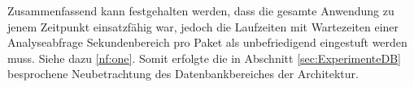     \noindent Zusammenfassend kann festgehalten werden, dass die gesamte Anwendung zu jenem Zeitpunkt einsatzfähig war, jedoch die Laufzeiten mit Wartezeiten einer Analyseabfrage Sekundenbereich pro Paket als unbefriedigend eingestuft werden muss. Siehe dazu \ref{nf:one}.
    Somit erfolgte die in Abschnitt \ref{sec:ExperimenteDB}  besprochene Neubetrachtung des Datenbankbereiches der Architektur.

